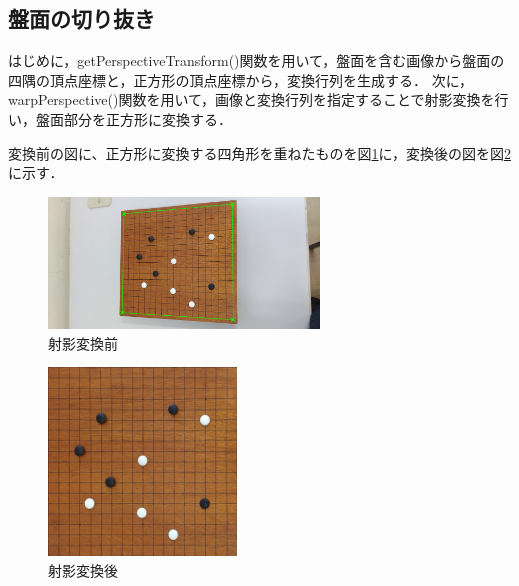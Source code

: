\documentclass[openright]{nitocs}
\numberwithin{equation}{section}
\begin{document}
        \subsection{盤面の切り抜き}
            \label{perspective_transform}
            はじめに，getPerspectiveTransform()関数を用いて，盤面を含む画像から盤面の四隅の頂点座標と，正方形の頂点座標から，変換行列を生成する．
            次に，warpPerspective()関数を用いて，画像と変換行列を指定することで射影変換を行い，盤面部分を正方形に変換する．
            
            変換前の図に、正方形に変換する四角形を重ねたものを図\ref{cornerImg}に，変換後の図を図\ref{boardImg}に示す．
            \begin{figure} %
                \begin{center}
                \includegraphics[width=72mm,height=35mm]{cornerImg.jpg} 
                \caption{射影変換前}
                \label{cornerImg}
                \end{center}
            \end{figure}
            \begin{figure} %
                \begin{center}
                \includegraphics[width=50mm,height=50mm]{boardImg.jpg} 
                \caption{射影変換後}
                \label{boardImg}
                \end{center}
            \end{figure}
\end{document}
